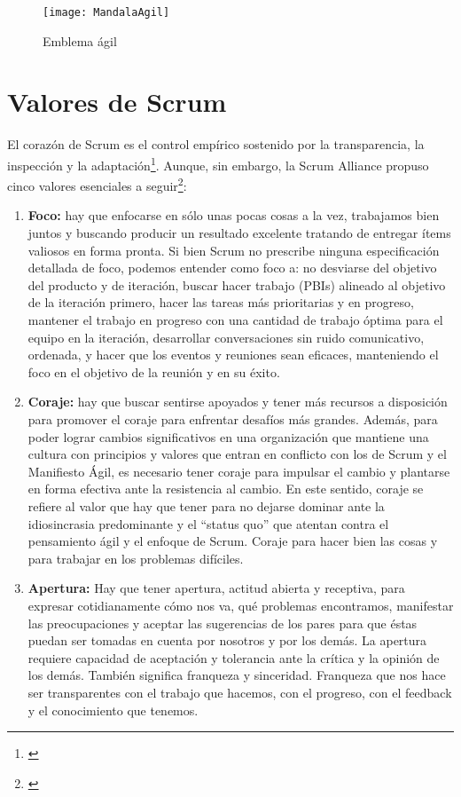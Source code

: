 \begin{figure}[h]
  \centering
  \texttt{[image: MandalaAgil]}
  \caption{Emblema ágil}
  \centering
  \label{fig:MandalaAgil} %
\end{figure}

\section{Valores de Scrum}

El corazón de Scrum es el control empírico sostenido por la transparencia, la inspección y la adaptación\footnote{\cite{Ken-Jeff-2013}}. Aunque, sin embargo, la Scrum Alliance propuso cinco valores esenciales a seguir\footnote{\cite{Scrum-Alliance-2015}}: 

\begin{enumerate}
\item \textbf{Foco:} hay que enfocarse en sólo unas pocas cosas a la vez, trabajamos bien juntos y buscando producir un resultado excelente tratando de entregar ítems valiosos en forma pronta. Si bien Scrum no prescribe ninguna especificación detallada de foco, podemos entender como foco a: no desviarse del objetivo del producto y de iteración, buscar hacer trabajo (PBIs) alineado al objetivo de la iteración primero, hacer las tareas más prioritarias y en progreso, mantener el trabajo en progreso con una cantidad de trabajo óptima para el equipo en la iteración, desarrollar conversaciones sin ruido comunicativo, ordenada, y hacer que los eventos y reuniones sean eficaces, manteniendo el foco en el objetivo de la reunión y en su éxito.

\item \textbf{Coraje:} hay que buscar sentirse apoyados y tener más recursos a disposición para promover el coraje para enfrentar desafíos más grandes. Además, para poder lograr cambios significativos en una organización que mantiene una cultura con principios y valores que entran en conflicto con los de Scrum y el Manifiesto Ágil, es necesario tener coraje para impulsar el cambio y plantarse en forma efectiva ante la resistencia al cambio. En este sentido, coraje se refiere al valor que hay que tener para no dejarse dominar ante la idiosincrasia predominante y el “status quo” que atentan contra el pensamiento ágil y el enfoque de Scrum. Coraje para hacer bien las cosas y para trabajar en los problemas difíciles.

\item \textbf{Apertura:} Hay que tener apertura, actitud abierta y receptiva, para expresar cotidianamente cómo nos va, qué problemas encontramos, manifestar las preocupaciones y aceptar las sugerencias de los pares para que éstas puedan ser tomadas en cuenta por nosotros y por los demás. La apertura requiere capacidad de aceptación y tolerancia ante la crítica y la opinión de los demás. También significa franqueza y sinceridad. Franqueza que nos hace ser transparentes con el trabajo que hacemos, con el progreso, con el feedback y el conocimiento que tenemos. 


\end{enumerate}
